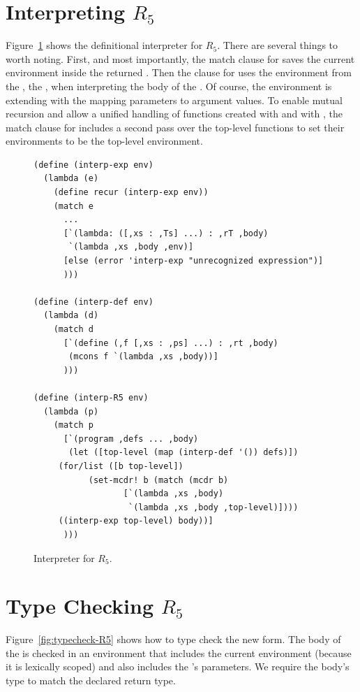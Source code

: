 \documentclass[11pt]{book}
\begin{document}
\section{Interpreting $R_5$}

Figure~\ref{fig:interp-R5} shows the definitional interpreter for
$R_5$. There are several things to worth noting. First, and most
importantly, the match clause for  saves the current
environment inside the returned . Then the clause for
 uses the environment from the , the
, when interpreting the body of the .  Of
course, the  environment is extending with the mapping
parameters to argument values. To enable mutual recursion and allow a
unified handling of functions created with  and with
, the match clause for  includes a second
pass over the top-level functions to set their environments to be the
top-level environment.

\begin{figure}[tbp]
\begin{lstlisting}
(define (interp-exp env)
  (lambda (e)
    (define recur (interp-exp env))
    (match e
      ...
      [`(lambda: ([,xs : ,Ts] ...) : ,rT ,body)
       `(lambda ,xs ,body ,env)]
      [else (error 'interp-exp "unrecognized expression")]
      )))

(define (interp-def env)
  (lambda (d)
    (match d
      [`(define (,f [,xs : ,ps] ...) : ,rt ,body)
       (mcons f `(lambda ,xs ,body))]
      )))

(define (interp-R5 env)
  (lambda (p)
    (match p
      [`(program ,defs ... ,body)
       (let ([top-level (map (interp-def '()) defs)])
	 (for/list ([b top-level])
		   (set-mcdr! b (match (mcdr b)
				  [`(lambda ,xs ,body)
				   `(lambda ,xs ,body ,top-level)])))
	 ((interp-exp top-level) body))]
      )))
\end{lstlisting}
\caption{Interpreter for $R_5$.}
\label{fig:interp-R5}
\end{figure}

\section{Type Checking $R_5$}

Figure~\ref{fig:typecheck-R5} shows how to type check the new
 form. The body of the  is checked in an
environment that includes the current environment (because it is
lexically scoped) and also includes the 's parameters.  We
require the body's type to match the declared return type.
\end{document}
